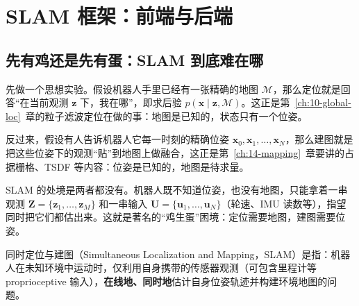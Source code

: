 \usetikzlibrary{arrows.meta, positioning}

\chapter{SLAM 框架：前端与后端}\label{ch:11-slam-framework}


\section{先有鸡还是先有蛋：SLAM 到底难在哪}\label{sec:11-problem}

先做一个思想实验。假设机器人手里已经有一张精确的地图 $\mathcal{M}$，那么定位就是回答``在当前观测 $\bm{z}$ 下，我在哪''，即求后验 $p(\bm{x}\mid \bm{z},\mathcal{M})$。这正是第~\ref{ch:10-global-loc}~章的粒子滤波定位在做的事：地图是已知的，状态只有一个位姿。

反过来，假设有人告诉机器人它每一时刻的精确位姿 $\bm{x}_0,\bm{x}_1,\dots,\bm{x}_N$，那么建图就是把这些位姿下的观测``贴''到地图上做融合，这正是第~\ref{ch:14-mapping}~章要讲的占据栅格、TSDF 等内容：位姿是已知的，地图是待求量。

SLAM 的处境是两者都没有。机器人既不知道位姿，也没有地图，只能拿着一串观测 $\bm{Z}=\{\bm{z}_1,\dots,\bm{z}_M\}$ 和一串输入 $\bm{U}=\{\bm{u}_1,\dots,\bm{u}_N\}$（轮速、IMU 读数等），指望同时把它们都估出来。这就是著名的``鸡生蛋''困境：定位需要地图，建图需要位姿。

\begin{definition}[SLAM]
同时定位与建图（Simultaneous Localization and Mapping，SLAM）是指：机器人在未知环境中运动时，仅利用自身携带的传感器观测（可包含里程计等 proprioceptive 输入），\textbf{在线地、同时地}估计自身位姿轨迹并构建环境地图的问题。
\end{definition}

